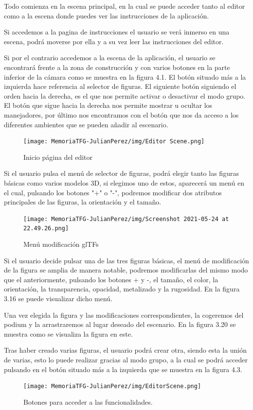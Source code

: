 \documentclass[a4paper, 12pt]{book}
\begin{document}
Todo comienza en la escena principal, en la cual se puede acceder tanto al editor como a la escena donde puedes ver las instrucciones de la aplicación.

Si accedemos a la pagina de instrucciones el usuario se verá inmerso en una escena, podrá moverse por ella y a su vez leer las instrucciones del editor.

Si por el contrario accedemos a la escena de la aplicación, el usuario se encontrará frente a la zona de construcción y con varios botones en la parte inferior de la cámara como se muestra en la figura 4.1. El botón situado más a la izquierda hace referencia al selector de figuras. El siguiente botón siguiendo el orden hacia la derecha, es el que nos permite activar o desactivar el modo grupo. El botón que sigue hacia la derecha nos permite mostrar u ocultar los manejadores, por último nos encontramos con el botón que nos da acceso a los diferentes ambientes que se pueden añadir al escenario.

\begin{figure}[H]
  \centering
  \texttt{[image: MemoriaTFG-JulianPerez/img/Editor Scene.png]}
  \caption{Inicio página del editor}\label{home}
\end{figure}

Si el usuario pulsa el menú de selector de figuras, podrá elegir tanto las figuras básicas como varios modelos 3D, si elegimos uno de estos, aparecerá un menú en el cual, pulsando los botones "+" o "-", podremos modificar dos atributos principales de las figuras, la orientación y el tamaño.

\begin{figure}[H]
  \centering
  \texttt{[image: MemoriaTFG-JulianPerez/img/Screenshot 2021-05-24 at 22.49.26.png]}
  \caption{Menú modificación glTFs}\label{home}
\end{figure}

Si el usuario decide pulsar una de las tres figuras básicas, el menú de modificación de la figura se amplia de manera notable, podremos modificarlas del mismo modo que el anteriormente, pulsando los botones + y -, el tamaño, el color, la orientación, la transparencia, opacidad, metalizado y la rugosidad. En la figura 3.16 se puede visualizar dicho menú.

Una vez elegida la figura y las modificaciones correspondientes, la cogeremos del podium y la arrastraremos al lugar deseado del escenario. En la figura 3.20 se muestra como se visualiza la figura en este.

Tras haber creado varias figuras, el usuario podrá crear otra, siendo esta la unión de varias, esto lo puede realizar gracias al modo grupo, a la cual se podrá acceder pulsando en el botón situado más a la izquierda que se muestra en la figura 4.3.
\begin{figure}[H]
  \centering
  \texttt{[image: MemoriaTFG-JulianPerez/img/EditorScene.png]}
  \caption{Botones para acceder a las funcionalidades.}\label{home}
\end{figure}
\end{document}
